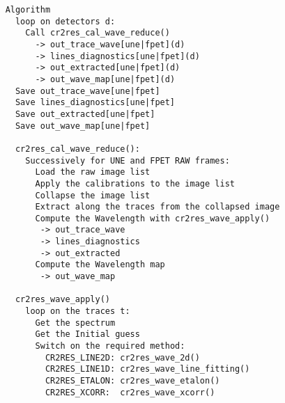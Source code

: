 \begin{verbatim}
    Algorithm                                                             
      loop on detectors d:                                                
        Call cr2res_cal_wave_reduce()                                     
          -> out_trace_wave[une|fpet](d)                                  
          -> lines_diagnostics[une|fpet](d)                               
          -> out_extracted[une|fpet](d)                                   
          -> out_wave_map[une|fpet](d)                                    
      Save out_trace_wave[une|fpet]                                       
      Save lines_diagnostics[une|fpet]                                    
      Save out_extracted[une|fpet]                                        
      Save out_wave_map[une|fpet]                                         
                                                                          
      cr2res_cal_wave_reduce():                                           
        Successively for UNE and FPET RAW frames:                         
          Load the raw image list                                         
          Apply the calibrations to the image list                        
          Collapse the image list                                         
          Extract along the traces from the collapsed image               
          Compute the Wavelength with cr2res_wave_apply()                 
           -> out_trace_wave                                              
           -> lines_diagnostics                                           
           -> out_extracted                                               
          Compute the Wavelength map                                      
           -> out_wave_map                                                
                                                                          
      cr2res_wave_apply()                                                 
        loop on the traces t:                                             
          Get the spectrum                                                
          Get the Initial guess                                           
          Switch on the required method:                                  
            CR2RES_LINE2D: cr2res_wave_2d()                               
            CR2RES_LINE1D: cr2res_wave_line_fitting()                     
            CR2RES_ETALON: cr2res_wave_etalon()                           
            CR2RES_XCORR:  cr2res_wave_xcorr()                            
                                                                          

\end{verbatim}
